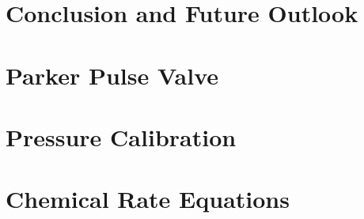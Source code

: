 \documentclass [PhD,nolistoftables,scheader] {uclathes}
\begin{document}
\chapter{Conclusion and Future Outlook}


\appendix

\chapter{Parker Pulse Valve}


\chapter{Pressure Calibration} \label{sec: calibration}


\chapter{Chemical Rate Equations}


%




\end{document}
